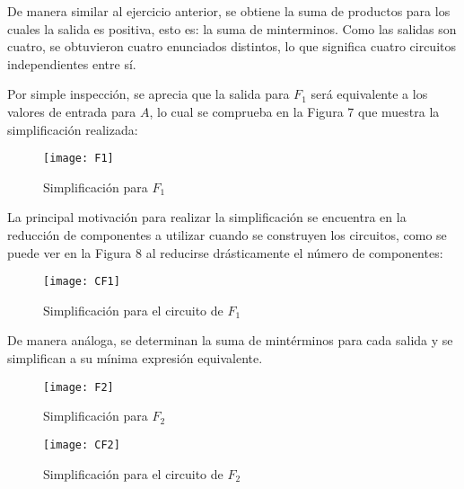 \documentclass[a4paper,12pt]{article}
\begin{document}
\vspace{1cm}

De manera similar al ejercicio anterior, se obtiene la suma de productos para los cuales la salida es positiva, esto es: la suma de minterminos. Como las salidas son cuatro, se obtuvieron cuatro enunciados distintos, lo que significa cuatro circuitos independientes entre sí.\par

\vspace{1cm}

Por simple inspección, se aprecia que la salida para $F_1$ será equivalente a los valores de entrada para $A$, lo cual se comprueba en la Figura 7 que muestra la simplificación realizada:\par

\begin{figure}[ht!]
	\centering

	\texttt{[image: F1]}

	\caption{Simplificación para $F_1$}
\end{figure}

La principal motivación para realizar la simplificación se encuentra en la reducción de componentes a utilizar cuando se construyen los circuitos, como se puede ver en la Figura 8 al reducirse drásticamente el número de componentes:\par


\begin{figure}[ht!]
	\centering

	\texttt{[image: CF1]}

	\caption{Simplificación para el circuito de $F_1$}
\end{figure}

\newpage

De manera análoga, se determinan la suma de mintérminos para cada salida y se simplifican a su mínima expresión equivalente.\par

\begin{figure}[ht!]
	\centering

	\texttt{[image: F2]}

	\caption{Simplificación para $F_2$}
\end{figure}

\vspace{1cm}

\begin{figure}[ht!]
	\centering

	\texttt{[image: CF2]}

	\caption{Simplificación para el circuito de $F_2$}
\end{figure}
\end{document}

